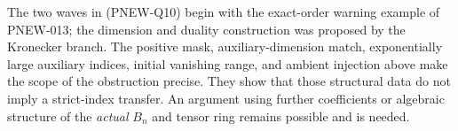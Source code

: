 The two waves in (PNEW-Q10) begin with the exact-order warning example
of PNEW-013; the dimension and duality construction was proposed by
the Kronecker branch. The positive mask, auxiliary-dimension match,
exponentially large auxiliary indices, initial vanishing range, and
ambient injection above make the scope of the obstruction precise.
They show that those structural data do not imply a strict-index
transfer. An argument using further coefficients or algebraic structure
of the \emph{actual} $B_n$ and tensor ring remains possible and is needed.
